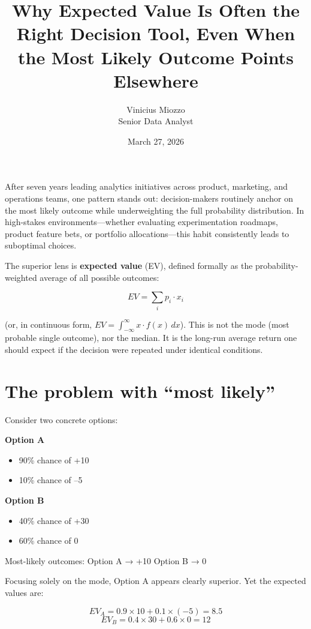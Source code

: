 \documentclass[11pt,a4paper]{article}
\title{Why Expected Value Is Often the Right Decision Tool, Even When the Most Likely Outcome Points Elsewhere}
\author{Vinicius Miozzo \\ Senior Data Analyst}
\date{March 27, 2026}
\begin{document}
\maketitle

\vspace{0.5em}

After seven years leading analytics initiatives across product, marketing, and operations teams, one pattern stands out: decision-makers routinely anchor on the most likely outcome while underweighting the full probability distribution. In high-stakes environments—whether evaluating experimentation roadmaps, product feature bets, or portfolio allocations—this habit consistently leads to suboptimal choices.

The superior lens is \textbf{expected value} (EV), defined formally as the probability-weighted average of all possible outcomes:

\[
EV = \sum_{i} p_i \cdot x_i
\]

(or, in continuous form, \( EV = \int_{-\infty}^{\infty} x \cdot f(x) \, dx \)). This is not the mode (most probable single outcome), nor the median. It is the long-run average return one should expect if the decision were repeated under identical conditions.

\section{The problem with “most likely”}

Consider two concrete options:

\textbf{Option A}  
\begin{itemize}[noitemsep]
    \item 90\% chance of +10
    \item 10\% chance of –5
\end{itemize}

\textbf{Option B}  
\begin{itemize}[noitemsep]
    \item 40\% chance of +30
    \item 60\% chance of 0
\end{itemize}

Most-likely outcomes:  
Option A → +10  
Option B → 0  

Focusing solely on the mode, Option A appears clearly superior. Yet the expected values are:

\[
EV_A = 0.9 \times 10 + 0.1 \times (-5) = 8.5
\]
\[
EV_B = 0.4 \times 30 + 0.6 \times 0 = 12
\]
\end{document}
